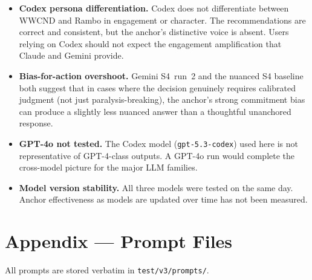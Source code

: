 \documentclass[10.5pt,a4paper]{article}
\begin{document}
\begin{itemize}[leftmargin=1.4em, itemsep=3pt]
  \item \textbf{Codex persona differentiation.} Codex does not differentiate between WWCND
    and Rambo in engagement or character. The recommendations are correct and consistent,
    but the anchor's distinctive voice is absent. Users relying on Codex should not expect
    the engagement amplification that Claude and Gemini provide.

  \item \textbf{Bias-for-action overshoot.} Gemini S4~run~2 and the nuanced S4 baseline both
    suggest that in cases where the decision genuinely requires calibrated judgment
    (not just paralysis-breaking), the anchor's strong commitment bias can produce a
    slightly less nuanced answer than a thoughtful unanchored response.

  \item \textbf{GPT-4o not tested.} The Codex model (\texttt{gpt-5.3-codex}) used here is
    not representative of GPT-4-class outputs. A GPT-4o run would complete the
    cross-model picture for the major LLM families.

  \item \textbf{Model version stability.} All three models were tested on the same day.
    Anchor effectiveness as models are updated over time has not been measured.
\end{itemize}

\newpage

\section*{Appendix — Prompt Files}

All prompts are stored verbatim in \texttt{test/v3/prompts/}.
\end{document}
